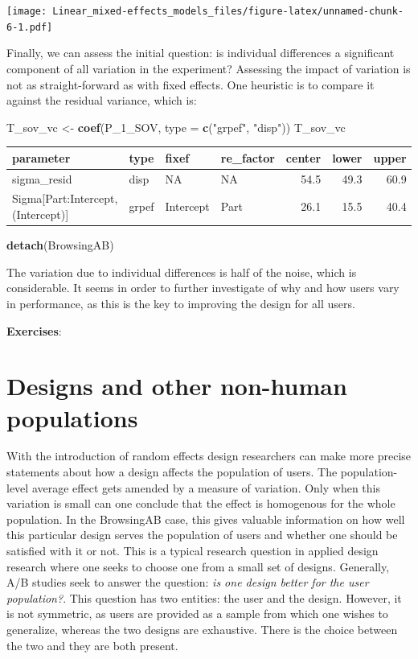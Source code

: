 \documentclass[]{svmono}
\newenvironment{Shaded}{\begin{snugshade}}{\end{snugshade}}
\newcommand{\KeywordTok}[1]{\textcolor[rgb]{0.13,0.29,0.53}{\textbf{#1}}}
\newcommand{\DataTypeTok}[1]{\textcolor[rgb]{0.13,0.29,0.53}{#1}}
\newcommand{\StringTok}[1]{\textcolor[rgb]{0.31,0.60,0.02}{#1}}
\newcommand{\NormalTok}[1]{#1}
\theoremstyle{definition}
\theoremstyle{definition}
\theoremstyle{definition}
\theoremstyle{remark}
\begin{document}
\texttt{[image: Linear\_mixed-effects\_models\_files/figure-latex/unnamed-chunk-6-1.pdf]}

Finally, we can assess the initial question: is individual differences a
significant component of all variation in the experiment? Assessing the
impact of variation is not as straight-forward as with fixed effects.
One heuristic is to compare it against the residual variance, which is:

\begin{Shaded}
\begin{Highlighting}[]
\NormalTok{T_sov_vc <-}\StringTok{ }\KeywordTok{coef}\NormalTok{(P_1_SOV, }\DataTypeTok{type =} \KeywordTok{c}\NormalTok{(}\StringTok{"grpef"}\NormalTok{, }\StringTok{"disp"}\NormalTok{))}
\NormalTok{T_sov_vc}
\end{Highlighting}
\end{Shaded}

\begin{longtable}[]{@{}llllrrr@{}}
\toprule
parameter & type & fixef & re\_factor & center & lower &
upper\tabularnewline
\midrule
\endhead
sigma\_resid & disp & NA & NA & 54.5 & 49.3 & 60.9\tabularnewline
Sigma{[}Part:Intercept,(Intercept){]} & grpef & Intercept & Part & 26.1
& 15.5 & 40.4\tabularnewline
\bottomrule
\end{longtable}

\begin{Shaded}
\begin{Highlighting}[]
\KeywordTok{detach}\NormalTok{(BrowsingAB)}
\end{Highlighting}
\end{Shaded}

The variation due to individual differences is half of the noise, which
is considerable. It seems in order to further investigate of why and how
users vary in performance, as this is the key to improving the design
for all users.

\textbf{Exercises}:

\section{Designs and other non-human
populations}\label{designs-and-other-non-human-populations}

With the introduction of random effects design researchers can make more
precise statements about how a design affects the population of users.
The population-level average effect gets amended by a measure of
variation. Only when this variation is small can one conclude that the
effect is homogenous for the whole population. In the BrowsingAB case,
this gives valuable information on how well this particular design
serves the population of users and whether one should be satisfied with
it or not. This is a typical research question in applied design
research where one seeks to choose one from a small set of designs.
Generally, A/B studies seek to answer the question: \emph{is one design
better for the user population?}. This question has two entities: the
user and the design. However, it is not symmetric, as users are provided
as a sample from which one wishes to generalize, whereas the two designs
are exhaustive. There is the choice between the two and they are both
present.
\end{document}
